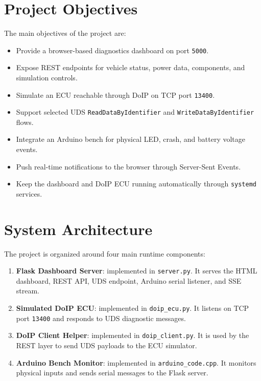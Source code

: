 \documentclass[a4paper,10pt,titlepage,oneside]{article}
\begin{document}
\section{Project Objectives}

The main objectives of the project are:

\begin{itemize}[leftmargin=*]
    \item Provide a browser-based diagnostics dashboard on port \texttt{5000}.
    \item Expose REST endpoints for vehicle status, power data, components, and simulation controls.
    \item Simulate an ECU reachable through DoIP on TCP port \texttt{13400}.
    \item Support selected UDS \texttt{ReadDataByIdentifier} and \texttt{WriteDataByIdentifier} flows.
    \item Integrate an Arduino bench for physical LED, crash, and battery voltage events.
    \item Push real-time notifications to the browser through Server-Sent Events.
    \item Keep the dashboard and DoIP ECU running automatically through \texttt{systemd} services.
\end{itemize}

\section{System Architecture}

The project is organized around four main runtime components:

\begin{enumerate}[leftmargin=*]
    \item \textbf{Flask Dashboard Server}: implemented in \texttt{server.py}. It serves the HTML dashboard, REST API, UDS endpoint, Arduino serial listener, and SSE stream.
    \item \textbf{Simulated DoIP ECU}: implemented in \texttt{doip\_ecu.py}. It listens on TCP port \texttt{13400} and responds to UDS diagnostic messages.
    \item \textbf{DoIP Client Helper}: implemented in \texttt{doip\_client.py}. It is used by the REST layer to send UDS payloads to the ECU simulator.
    \item \textbf{Arduino Bench Monitor}: implemented in \texttt{arduino\_code.cpp}. It monitors physical inputs and sends serial messages to the Flask server.
\end{enumerate}
\end{document}
